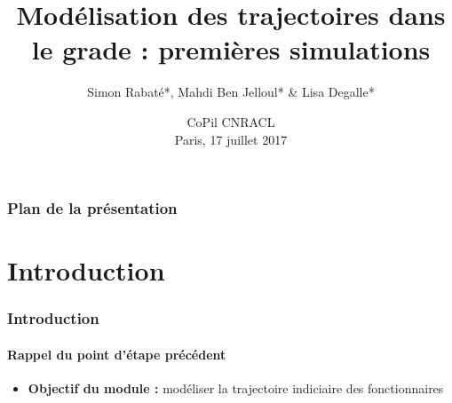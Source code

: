 \documentclass[xcolor=table,ignorenonframetext,12pt]{beamer}
\title{Modélisation des trajectoires dans le grade : premières simulations}
\author{Simon Rabaté*, Mahdi Ben Jelloul* \& Lisa Degalle*}
\institute{
  \inst{*} IPP
}
\date{CoPil CNRACL\\
	Paris, 17 juillet 2017}
\newenvironment{choixmarges}[2]{\begin{list}{}{%
\setlength{\topsep}{0pt}%
\setlength{\leftmargin}{0pt}%
\setlength{\rightmargin}{0pt}%
\setlength{\listparindent}{\parindent}%
\setlength{\itemindent}{\parindent}%
\setlength{\parsep}{0pt plus 1pt}%
\addtolength{\leftmargin}{#1}%
\addtolength{\rightmargin}{#2}%
}\item }{\end{list}}
\begin{document}
\frame{\maketitle}


\begin{frame}
    \frametitle{Plan de la présentation}
    \tableofcontents[hidesubsections]
\end{frame}



\section{Introduction}


\begin{frame}
\frametitle{Introduction}
\framesubtitle{Rappel du point d'étape précédent}


\begin{choixmarges}{-0.5cm}{-0.5cm}



\begin{itemize}
\item \textbf{Objectif du module :} modéliser la trajectoire indiciaire des fonctionnaires
\vspace{0.1cm}

%
%

	
\end{itemize}


\end{choixmarges}
\end{frame}
\end{document}
